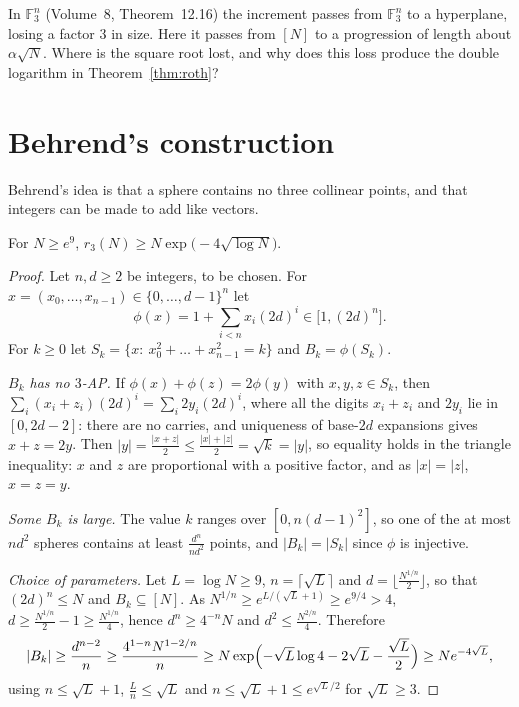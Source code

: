 \begin{think}
In $\mathbb F_3^n$ (Volume~8, Theorem~12.16) the increment passes from $\mathbb F_3^n$ to a hyperplane, losing a factor $3$ in size. Here it passes from $[N]$ to a progression of length about $\alpha\sqrt N$. Where is the square root lost, and why does this loss produce the double logarithm in Theorem~\ref{thm:roth}?
\end{think}

\section{Behrend's construction}

Behrend's idea is that a sphere contains no three collinear points, and that integers can be made to add like vectors.

\begin{theorem}[Behrend, 1946]\label{thm:behrend}
For $N\ge e^9$, $r_3(N)\ge N\exp\bigl(-4\sqrt{\log N}\bigr)$.
\end{theorem}
\begin{proof}
Let $n,d\ge2$ be integers, to be chosen. For $x=(x_0,\dots,x_{n-1})\in\{0,\dots,d-1\}^n$ let
\[
\phi(x)=1+\sum_{i<n}x_i(2d)^i\in\bigl[1,(2d)^n\bigr].
\]
For $k\ge0$ let $S_k=\{x:\ x_0^2+\dots+x_{n-1}^2=k\}$ and $B_k=\phi(S_k)$.

\emph{$B_k$ has no $3$-AP.} If $\phi(x)+\phi(z)=2\phi(y)$ with $x,y,z\in S_k$, then $\sum_i(x_i+z_i)(2d)^i=\sum_i2y_i(2d)^i$, where all the digits $x_i+z_i$ and $2y_i$ lie in $[0,2d-2]$: there are no carries, and uniqueness of base-$2d$ expansions gives $x+z=2y$. Then $|y|=\frac{|x+z|}2\le\frac{|x|+|z|}2=\sqrt k=|y|$, so equality holds in the triangle inequality: $x$ and $z$ are proportional with a positive factor, and as $|x|=|z|$, $x=z=y$.

\emph{Some $B_k$ is large.} The value $k$ ranges over $[0,n(d-1)^2]$, so one of the at most $nd^2$ spheres contains at least $\frac{d^n}{nd^2}$ points, and $|B_k|=|S_k|$ since $\phi$ is injective.

\emph{Choice of parameters.} Let $L=\log N\ge9$, $n=\lceil\sqrt L\rceil$ and $d=\lfloor\frac{N^{1/n}}2\rfloor$, so that $(2d)^n\le N$ and $B_k\subseteq[N]$. As $N^{1/n}\ge e^{L/(\sqrt L+1)}\ge e^{9/4}>4$, $d\ge\frac{N^{1/n}}2-1\ge\frac{N^{1/n}}4$, hence $d^n\ge4^{-n}N$ and $d^2\le\frac{N^{2/n}}4$. Therefore
\[
|B_k|\ge\frac{d^{n-2}}n\ge\frac{4^{1-n}N^{1-2/n}}n\ge N\exp\Bigl(-\sqrt L\log4-2\sqrt L-\frac{\sqrt L}2\Bigr)\ge Ne^{-4\sqrt L},
\]
using $n\le\sqrt L+1$, $\frac Ln\le\sqrt L$ and $n\le\sqrt L+1\le e^{\sqrt L/2}$ for $\sqrt L\ge3$.
\end{proof}

